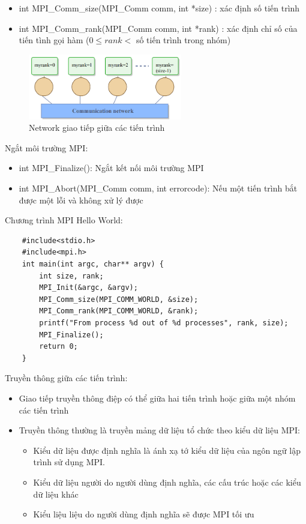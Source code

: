 \documentclass[14pt, a4paper]{article}
\numberwithin{equation}{section}
\numberwithin{figure}{section}
\numberwithin{dl}{section}
\numberwithin{md}{section}
\numberwithin{bd}{section}
\numberwithin{dn}{section}
\numberwithin{hq}{section}
\begin{document}
\begin{itemize}
    \item int MPI\_Comm\_size(MPI\_Comm comm, int *size) : xác định số tiến trình
    \item int MPI\_Comm\_rank(MPI\_Comm comm, int *rank) : xác định chỉ số của tiến tình gọi hàm ($0 \leq rank <$ số tiến trình trong nhóm)
\end{itemize}
\begin{figure}[H]
    \centering
    \includegraphics[width=0.6\textwidth]{figures/MPI/Rank.png}
    \caption{Network giao tiếp giữa các tiến trình}
\end{figure}

Ngắt môi trường MPI:

\begin{itemize}
    \item int MPI\_Finalize(): Ngắt kết nối môi trường MPI
    \item int MPI\_Abort(MPI\_Comm comm, int errorcode): Nếu một tiến trình bắt được một lỗi và không xử lý được
\end{itemize}


Chương trình MPI Hello World:

\begin{verbatim}
    #include<stdio.h>
    #include<mpi.h>
    int main(int argc, char** argv) {
        int size, rank;
        MPI_Init(&argc, &argv);
        MPI_Comm_size(MPI_COMM_WORLD, &size);
        MPI_Comm_rank(MPI_COMM_WORLD, &rank);
        printf("From process %d out of %d processes", rank, size);
        MPI_Finalize();
        return 0;
    }
\end{verbatim}

Truyền thông giữa các tiến trình:

\begin{itemize}
    \item Giao tiếp truyền thông điệp có thể giữa hai tiến trình hoặc giữa một nhóm các tiến trình
    \item Truyền thông thường là truyền mảng dữ liệu tổ chức theo kiểu dữ liệu MPI:
    \begin{itemize}
        \item Kiểu dữ liệu được định nghĩa là ánh xạ tớ kiểu dữ liệu của ngôn ngữ lập trình sử dụng MPI.
        \item Kiểu dữ liệu người do người dùng định nghĩa, các cấu trúc hoặc các kiểu dữ liệu khác
        \item Kiểu liệu liệu do người dùng định nghĩa sẽ được MPI tối ưu
    \end{itemize}
\end{itemize}
\end{document}
